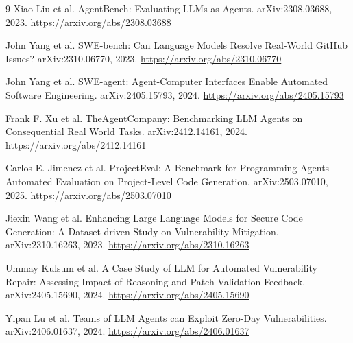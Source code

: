 \documentclass[10pt]{article}
\begin{document}
\begin{thebibliography}{9}\small
{}
Xiao Liu et al.
\newblock AgentBench: Evaluating LLMs as Agents.
\newblock arXiv:2308.03688, 2023.
\newblock \url{https://arxiv.org/abs/2308.03688}

John Yang et al.
\newblock SWE-bench: Can Language Models Resolve Real-World GitHub Issues?
\newblock arXiv:2310.06770, 2023.
\newblock \url{https://arxiv.org/abs/2310.06770}

John Yang et al.
\newblock SWE-agent: Agent-Computer Interfaces Enable Automated Software Engineering.
\newblock arXiv:2405.15793, 2024.
\newblock \url{https://arxiv.org/abs/2405.15793}

Frank F. Xu et al.
\newblock TheAgentCompany: Benchmarking LLM Agents on Consequential Real World Tasks.
\newblock arXiv:2412.14161, 2024.
\newblock \url{https://arxiv.org/abs/2412.14161}

Carlos E. Jimenez et al.
\newblock ProjectEval: A Benchmark for Programming Agents Automated Evaluation on Project-Level Code Generation.
\newblock arXiv:2503.07010, 2025.
\newblock \url{https://arxiv.org/abs/2503.07010}

Jiexin Wang et al.
\newblock Enhancing Large Language Models for Secure Code Generation: A Dataset-driven Study on Vulnerability Mitigation.
\newblock arXiv:2310.16263, 2023.
\newblock \url{https://arxiv.org/abs/2310.16263}

Ummay Kulsum et al.
\newblock A Case Study of LLM for Automated Vulnerability Repair: Assessing Impact of Reasoning and Patch Validation Feedback.
\newblock arXiv:2405.15690, 2024.
\newblock \url{https://arxiv.org/abs/2405.15690}

Yipan Lu et al.
\newblock Teams of LLM Agents can Exploit Zero-Day Vulnerabilities.
\newblock arXiv:2406.01637, 2024.
\newblock \url{https://arxiv.org/abs/2406.01637}
\end{thebibliography}
\end{document}
